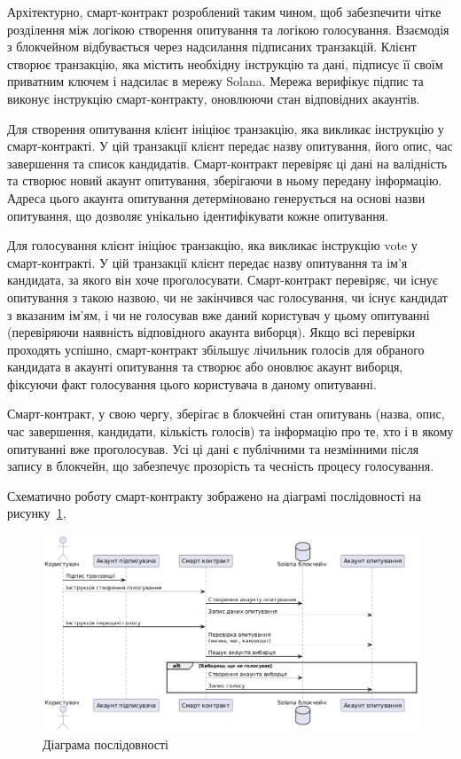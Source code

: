 \documentclass[14pt]{extreport}
\begin{document}
  Архітектурно, смарт-контракт розроблений таким чином, щоб забезпечити чітке розділення між логікою створення опитування та логікою голосування. Взаємодія з блокчейном відбувається через надсилання підписаних транзакцій. Клієнт створює транзакцію, яка містить необхідну інструкцію та дані, підписує її своїм приватним ключем і надсилає в мережу Solana. Мережа верифікує підпис та виконує інструкцію смарт-контракту, оновлюючи стан відповідних акаунтів.

  Для створення опитування клієнт ініціює транзакцію, яка викликає інструкцію у смарт-контракті. У цій транзакції клієнт передає назву опитування, його опис, час завершення та список кандидатів. Смарт-контракт перевіряє ці дані на валідність та створює новий акаунт опитування, зберігаючи в ньому передану інформацію. Адреса цього акаунта опитування детерміновано генерується на основі назви опитування, що дозволяє унікально ідентифікувати кожне опитування.

  Для голосування клієнт ініціює транзакцію, яка викликає інструкцію vote у смарт-контракті. У цій транзакції клієнт передає назву опитування та ім'я кандидата, за якого він хоче проголосувати. Смарт-контракт перевіряє, чи існує опитування з такою назвою, чи не закінчився час голосування, чи існує кандидат з вказаним ім'ям, і чи не голосував вже даний користувач у цьому опитуванні (перевіряючи наявність відповідного акаунта виборця). Якщо всі перевірки проходять успішно, смарт-контракт збільшує лічильник голосів для обраного кандидата в акаунті опитування та створює або оновлює акаунт виборця, фіксуючи факт голосування цього користувача в даному опитуванні.
  
  Смарт-контракт, у свою чергу, зберігає в блокчейні стан опитувань (назва, опис, час завершення, кандидати, кількість голосів) та інформацію про те, хто і в якому опитуванні вже проголосував. Усі ці дані є публічними та незмінними після запису в блокчейн, що забезпечує прозорість та чесність процесу голосування.
  
  Схематично роботу смарт-контракту зображено на діаграмі послідовності на рисунку~\ref{fig:UMLSequence},
  
  \begin{figure}[H]
    \centering
    \includegraphics[scale=0.5]{UMLSequence}
    \caption{Діаграма послідовності}
    \label{fig:UMLSequence}
  \end{figure}
  
\end{document}
